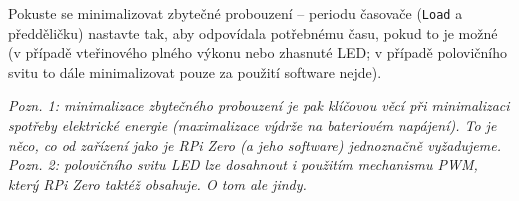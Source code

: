 \documentclass{article}
\begin{document}
Pokuste se minimalizovat zbytečné probouzení -- periodu časovače (\texttt{Load} a předděličku) nastavte tak, aby odpovídala potřebnému času, pokud to je možné (v případě vteřinového plného výkonu nebo zhasnuté LED; v případě polovičního svitu to dále minimalizovat pouze za použití software nejde).

\emph{Pozn. 1: minimalizace zbytečného probouzení je pak klíčovou věcí při minimalizaci spotřeby elektrické energie (maximalizace výdrže na bateriovém napájení). To je něco, co od zařízení jako je RPi Zero (a jeho software) jednoznačně vyžadujeme.}\\
\emph{Pozn. 2: polovičního svitu LED lze dosahnout i použitím mechanismu PWM, který RPi Zero taktéž obsahuje. O tom ale jindy.}
\end{document}
